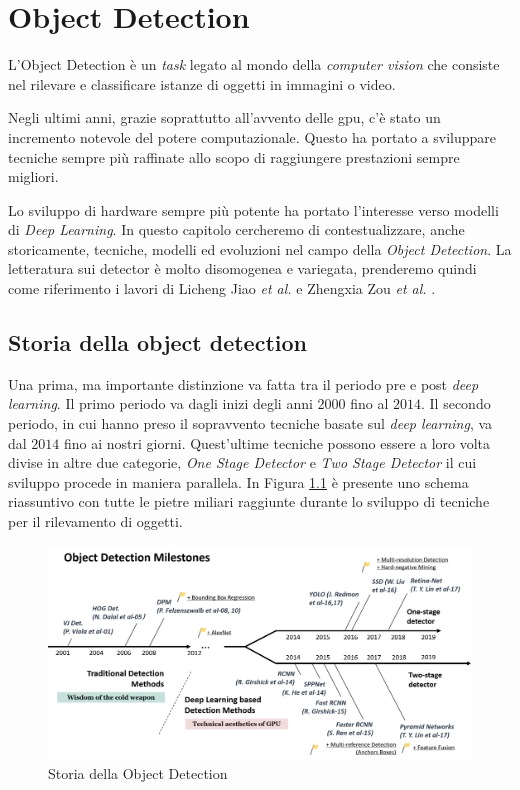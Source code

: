 \chapter{Object Detection}
L'Object Detection è un \textit{task} legato al mondo della \textit{computer vision}
che consiste nel rilevare e classificare istanze di oggetti in immagini o video.

Negli ultimi anni, grazie soprattutto all'avvento delle \ac{gpu}, c'è stato un 
incremento notevole del potere computazionale. Questo ha portato a sviluppare tecniche 
sempre più raffinate allo scopo di raggiungere prestazioni sempre migliori. 

Lo sviluppo di hardware sempre più potente ha portato l'interesse verso modelli di  \textit{Deep Learning}. 
In questo capitolo cercheremo di contestualizzare, anche storicamente, tecniche, modelli ed evoluzioni
nel campo della \textit{Object Detection}. 
La letteratura sui detector è molto disomogenea e variegata, prenderemo quindi come 
riferimento i lavori di Licheng Jiao \textit{et al.} 
\cite{DBLP:journals/corr/abs-1907-09408} e 
Zhengxia Zou \textit{et al.} \cite{DBLP:journals/corr/abs-1905-05055}.


\section{Storia della object detection}
\label{sec:history_obj}
Una prima, ma importante distinzione va fatta tra il periodo pre e post \textit{deep learning}. Il primo periodo va dagli inizi degli anni $2000$ fino al $2014$. Il secondo periodo, in cui hanno preso il sopravvento tecniche basate sul \textit{deep learning}, va dal $2014$ fino ai nostri giorni. Quest'ultime tecniche possono essere a loro volta divise in altre due categorie, \textit{One Stage Detector} e \textit{Two Stage Detector} il cui sviluppo procede in maniera parallela. In Figura \ref{fig:history_object_detection} è presente uno schema riassuntivo con tutte le pietre miliari raggiunte durante lo sviluppo di tecniche per il rilevamento di oggetti.
\begin{figure}
    \centering
    \includegraphics[width=\textwidth]{images/mile-stones.png}
    \caption{Storia della Object Detection \cite{DBLP:journals/corr/abs-1905-05055}}
    \label{fig:history_object_detection}
\end{figure}
